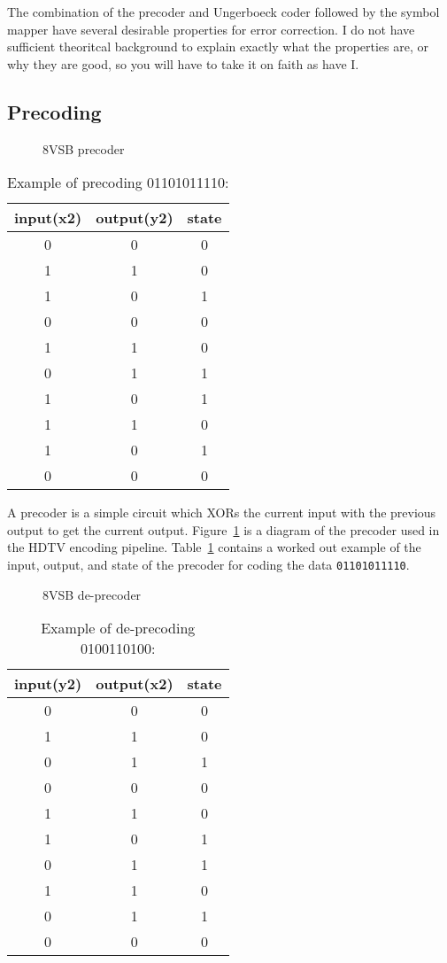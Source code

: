 \documentclass{article}
\begin{document}
The combination of the precoder and Ungerboeck coder followed by the symbol mapper
have several desirable properties for error correction. I do not have sufficient
theoritcal background to explain exactly what the properties are, or why they are good,
so you will have to take it on faith as have I.


\subsection{Precoding}
\begin{figure}
\center
\epsfxsize=3.5in
\caption{8VSB precoder}
\label{fig:precoder}
\end{figure}

\begin{table}
\center
	\begin{tabular}{c|c|c}
input(x2) & output(y2) & state  \\
\hline
0 & 0 & 0 \\
1 & 1 & 0 \\
1 & 0 & 1 \\
0 & 0 & 0 \\
1 & 1 & 0 \\
0 & 1 & 1 \\
1 & 0 & 1 \\
1 & 1 & 0 \\
1 & 0 & 1 \\
0 & 0 & 0 \\
\end{tabular}
\caption{Example of precoding 01101011110:}
\label{tbl:precoding_example}
\end{table}

A precoder is a simple circuit which XORs the current input with the previous
output to get the current output. Figure~\ref{fig:precoder} is a diagram of the
precoder used in the HDTV encoding pipeline. Table~\ref{tbl:precoding_example} 
contains a worked out example of the input, output, and state of the precoder
for coding the data \texttt{01101011110}.


\begin{figure}
\center
\epsfxsize=3.5in
\caption{8VSB de-precoder}
\label{fig:deprecoder}
\end{figure}

\begin{table}
\center
\begin{tabular}{c|c|c}
input(y2) & output(x2) & state  \\
\hline
0 & 0 & 0 \\
1 & 1 & 0 \\
0 & 1 & 1 \\
0 & 0 & 0 \\
1 & 1 & 0 \\
1 & 0 & 1 \\
0 & 1 & 1 \\
1 & 1 & 0 \\
0 & 1 & 1 \\
0 & 0 & 0 \\
\end{tabular}
\caption{Example of de-precoding 0100110100:}
\label{tbl:de_precoding_example}
\end{table}
\end{document}

